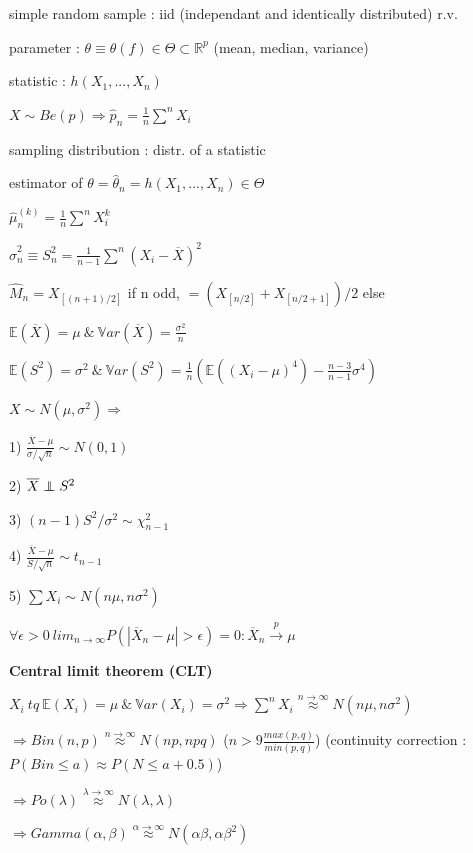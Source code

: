 \documentclass[a4paper,10.5pt]{article}
\newcommand\independent{\protect\mathpalette{\protect\independenT}{\perp}}
\def\independenT#1#2{\mathrel{\rlap{$#1#2$}\mkern2mu{#1#2}}}
\begin{document}
\begin{multicols}{4}
		simple random sample : iid (independant and identically distributed) r.v.
		
		parameter : $\theta \equiv \theta(f) \in \Theta \subset \mathbb{R}^p$ (mean, median, variance)
		
		statistic : $h(X_1, ..., X_n)$
		
		$X\sim Be(p) \Rightarrow \hat{p}_n = \frac{1}{n}\sum^n X_i$
		
		sampling distribution : distr. of a statistic
		
		estimator of $\theta = \hat{\theta}_n = h(X_1,...,X_n)\in \Theta$
		
		$\hat{\mu}_n^{(k)} = \frac{1}{n}\sum^n X_i^k$
		
		$\hat{\sigma}_n^2 \equiv S_n^2 = \frac{1}{n-1}\sum^n(X_i - \overline{X})^2$
		
		$\hat{M}_n = X_{[(n+1)/2]}$ if n odd, $=(X_{[n/2]}+X_{[n/2+1]})/2$ else
		
		$\mathbb{E}(\overline{X}) = \mu\ \&\ \mathbb{V}ar(\overline{X})=\frac{\sigma^2}{n}$
		
		$\mathbb{E}(S^2) = \sigma^2\ \&\ \mathbb{V}ar(S^2)=\frac{1}{n}\left(\mathbb{E}((X_i-\mu)^4)-\frac{n-3}{n-1}\sigma^4\right)$
		
		$X\sim N(\mu,\sigma^2) \Rightarrow$
		
		1) $\frac{\overline{X}-\mu}{\sigma/\sqrt{n}}\sim N(0,1)$
		
		2) $\overline{X} \independent S^2$
		
		3) $(n-1)S^2/\sigma^2 \sim \chi_{n-1}^2$
		
		4) $\frac{\overline{X}-\mu}{S/\sqrt{n}}\sim t_{n-1}$
		
		5) $\sum X_i \sim N(n\mu,n\sigma^2)$
		
		$\forall \epsilon>0\ lim_{n\to \infty} P(|\overline{X}_n-\mu|>\epsilon)=0 : \overline{X}_n\overset{p}\to\mu$
		
		\textbf{Central limit theorem (CLT)}
		
		$X_i\ tq\ \mathbb{E}(X_i)=\mu\ \&\ \mathbb{V}ar(X_i)=\sigma^2 \Rightarrow \sum^n X_i \overset{n\to\infty}\approx N(n\mu,n\sigma^2)$
		
		$\Rightarrow Bin(n,p) \overset{n\to\infty}\approx N(np,npq)$ ($n>9\frac{max(p,q)}{min(p,q)}$) (continuity correction : $P(Bin\leq a) \approx P(N \leq a+0.5)$)
		
		$\Rightarrow Po(\lambda) \overset{\lambda\to\infty}\approx N(\lambda,\lambda)$
		
		$\Rightarrow Gamma(\alpha,\beta)\overset{\alpha\to\infty}\approx N(\alpha\beta,\alpha\beta^2)$
		

\end{multicols}
\end{document}

